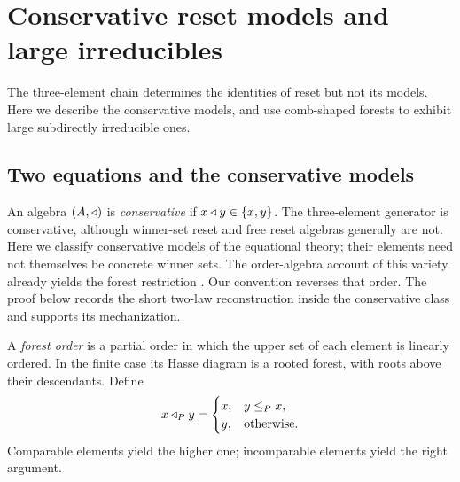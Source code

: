 \section{Conservative reset models and large irreducibles}\label{app:reset-models}
The three-element chain determines the identities of reset but not its models. Here we describe the conservative models, and
use comb-shaped forests to exhibit large subdirectly irreducible ones.

\subsection{Two equations and the conservative models}

An algebra $(A,\mathbin{\triangleleft})$ is \emph{conservative} if $x\mathbin{\triangleleft} y\in\{x,y\}$.
The three-element generator is conservative, although winner-set reset
and free reset algebras generally are not. Here we classify conservative
models of the equational theory; their elements need not themselves be
concrete winner sets.
The order-algebra account of this variety already yields the forest
restriction \cite[Theorem~3.3]{FreeseEtAl2002}. Our convention reverses
that order. The proof below records the short two-law reconstruction
inside the conservative class and supports its mechanization.

A \emph{forest order} is a partial order in which the upper set of each
element is linearly ordered. In the finite case its Hasse diagram is a
rooted forest, with roots above their descendants. Define
\begin{equation}\label{reset:eq:forest-op}
 x\mathbin{\triangleleft}_P y=\begin{cases}x,&y\leq_P x,\\y,&\text{otherwise}.\end{cases}
\end{equation}
Comparable elements yield the higher one; incomparable elements yield
the right argument.

